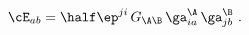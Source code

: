 \begin{equation} \label{eps_ab}
  \cE_{ab} = \half \ep^{ji}\, G_{\A\B}\, \ga^\A_{ia}\, \ga^\B_{jb}\ .
 \end{equation}

